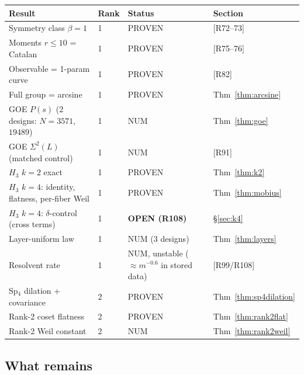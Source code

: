 \documentclass[11pt]{article}
\begin{document}
\begin{center}
\begin{tabular}{llll}
\toprule
Result & Rank & Status & Section\\
\midrule
Symmetry class $\beta = 1$ & 1 & PROVEN & [R72--73]\\
Moments $r \le 10$ = Catalan & 1 & PROVEN & [R75--76]\\
Observable = 1-param curve & 1 & PROVEN & [R82]\\
Full group = arcsine & 1 & PROVEN & Thm~\ref{thm:arcsine}\\
GOE $P(s)$ (2 designs: $N{=}3571$, $19489$) & 1 & NUM & Thm~\ref{thm:goe}\\
GOE $\Sigma^2(L)$ (matched control) & 1 & NUM & [R91]\\
$H_3$ $k{=}2$ exact & 1 & PROVEN & Thm~\ref{thm:k2}\\
$H_3$ $k{=}4$: identity, flatness, per-fiber Weil & 1 & PROVEN & Thm~\ref{thm:mobius}\\
$H_3$ $k{=}4$: $\delta$-control (cross terms) & 1 & \textbf{OPEN (R108)} & \S\ref{sec:k4}\\
Layer-uniform law & 1 & NUM (3 designs) & Thm~\ref{thm:layers}\\
Resolvent rate & 1 & NUM, unstable ($\approx m^{-0.6}$ in stored data) & [R99/R108]\\
Sp$_4$ dilation + covariance & 2 & PROVEN & Thm~\ref{thm:sp4dilation}\\
Rank-2 coset flatness & 2 & PROVEN & Thm~\ref{thm:rank2flat}\\
Rank-2 Weil constant & 2 & NUM & Thm~\ref{thm:rank2weil}\\
\bottomrule
\end{tabular}
\end{center}

\subsection{What remains}
\end{document}
